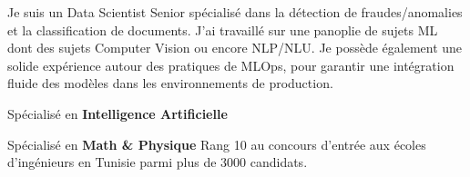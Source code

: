 \documentclass[10pt,letter,ragged2e,withhyper]{altacv}
\renewcommand{\divider}{\textcolor{body!30}{\hdashrule{\linewidth}{0.6pt}{0.5ex}}\medskip}
\begin{document}
\begin{paracol}{2}
\switchcolumn
{}
{\small
Je suis un Data Scientist Senior spécialisé dans la détection de fraudes/anomalies 
et la classification de documents. J'ai travaillé sur une panoplie de sujets ML 
dont des sujets Computer Vision ou encore NLP/NLU.
Je possède également une solide expérience autour des pratiques de MLOps,
pour garantir une intégration fluide des modèles dans les environnements de production.

}


{\small Spécialisé en \textbf{Intelligence Artificielle}}

\divider
{}
{\small Spécialisé en \textbf{Math \& Physique}}
{\small Rang 10 au concours d'entrée aux écoles d'ingénieurs en Tunisie parmi plus de 3000 candidats.}





\divider
{}

\divider
{}

\divider
{}

\divider
{}







\end{paracol}
\end{document}
